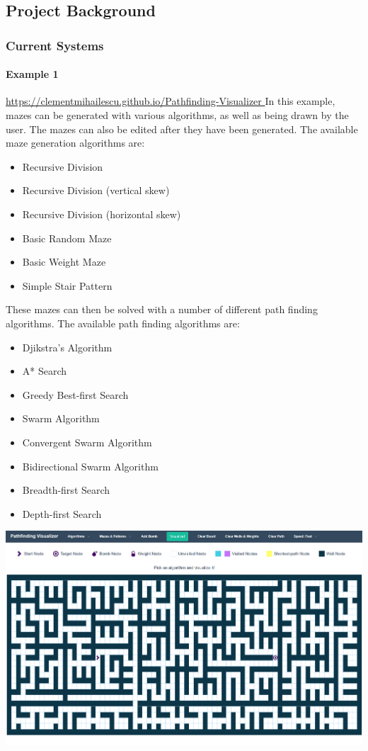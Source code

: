 \documentclass{article}
\begin{document}
\subsection{Project Background}
\subsubsection{Current Systems}
\paragraph{Example 1}
\href{https://clementmihailescu.github.io/Pathfinding-Visualizer/
}{https://clementmihailescu.github.io/Pathfinding-Visualizer
}
\newline
In this example, mazes can be generated with various algorithms, as well as being drawn by the user. The mazes can also be edited after they have been generated. The available maze generation algorithms are:
\begin{itemize}
    \item Recursive Division
    \item Recursive Division (vertical skew)
    \item Recursive Division (horizontal skew)
    \item Basic Random Maze
    \item Basic Weight Maze
    \item Simple Stair Pattern
\end{itemize}
These mazes can then be solved with a number of different path finding algorithms. The available path finding algorithms are:
\begin{itemize}
    \item Djikstra's Algorithm
    \item A* Search
    \item Greedy Best-first Search
    \item Swarm Algorithm
    \item Convergent Swarm Algorithm
    \item Bidirectional Swarm Algorithm
    \item Breadth-first Search
    \item Depth-first Search
\end{itemize}
\includegraphics[width=\linewidth]{assets/Existing Solutions/example 1.PNG}
\end{document}
